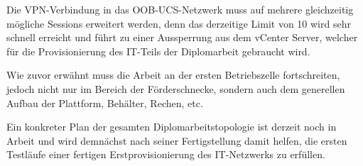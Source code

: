 \documentclass[
	headings=optiontotocandhead,%
	oneside,
	numbers=noenddot,%
	toc=flat, %
	10pt, %
	parskip=full, %
	listof=totoc, %
	listof=flat, %
	numbers=noenddot, %
	bibliography=totoc, %
	a4paper,DIV=14,
]{scrartcl}
\begin{document}
Die VPN-Verbindung in das OOB-UCS-Netzwerk muss auf mehrere gleichzeitig mögliche Sessions erweitert werden, denn das derzeitige Limit von 10 wird sehr schnell erreicht und führt zu einer Aussperrung aus dem vCenter Server, welcher für die Provisionierung des IT-Teils der Diplomarbeit gebraucht wird.

Wie zuvor erwähnt muss die Arbeit an der ersten Betriebszelle fortschreiten, jedoch nicht nur im Bereich der Förderschnecke, sondern auch dem generellen Aufbau der Plattform, Behälter, Rechen, etc.

Ein konkreter Plan der gesamten Diplomarbeitstopologie ist derzeit noch in Arbeit und wird demnächst nach seiner Fertigstellung damit helfen, die ersten Testläufe einer fertigen Erstprovisionierung des IT-Netzwerks zu erfüllen.
\end{document}

